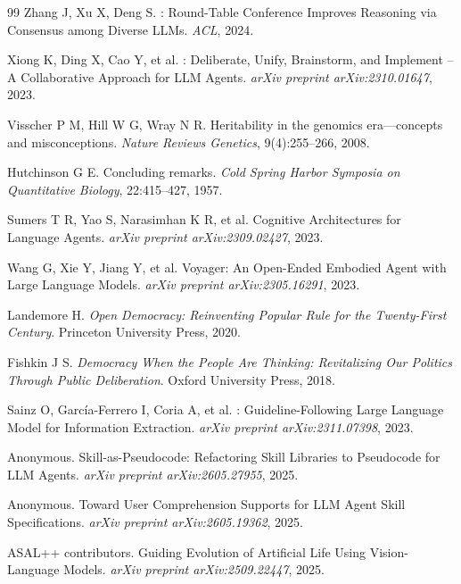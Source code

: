 \documentclass[12pt,a4paper]{ctexart}
\begin{document}
\begin{thebibliography}{99}
Zhang J, Xu X, Deng S.
: Round-Table Conference Improves Reasoning via Consensus among Diverse LLMs.
\newblock \emph{ACL}, 2024.

Xiong K, Ding X, Cao Y, et al.
: Deliberate, Unify, Brainstorm, and Implement -- A Collaborative Approach for LLM Agents.
\newblock \emph{arXiv preprint arXiv:2310.01647}, 2023.

Visscher P M, Hill W G, Wray N R.
\newblock Heritability in the genomics era---concepts and misconceptions.
\newblock \emph{Nature Reviews Genetics}, 9(4):255--266, 2008.

Hutchinson G E.
\newblock Concluding remarks.
\newblock \emph{Cold Spring Harbor Symposia on Quantitative Biology}, 22:415--427, 1957.

Sumers T R, Yao S, Narasimhan K R, et al.
\newblock Cognitive Architectures for Language Agents.
\newblock \emph{arXiv preprint arXiv:2309.02427}, 2023.

Wang G, Xie Y, Jiang Y, et al.
\newblock Voyager: An Open-Ended Embodied Agent with Large Language Models.
\newblock \emph{arXiv preprint arXiv:2305.16291}, 2023.

Landemore H.
\newblock \emph{Open Democracy: Reinventing Popular Rule for the Twenty-First Century}.
\newblock Princeton University Press, 2020.

Fishkin J S.
\newblock \emph{Democracy When the People Are Thinking: Revitalizing Our Politics Through Public Deliberation}.
\newblock Oxford University Press, 2018.

Sainz O, Garc{\'i}a-Ferrero I, Coria A, et al.
: Guideline-Following Large Language Model for Information Extraction.
\newblock \emph{arXiv preprint arXiv:2311.07398}, 2023.

Anonymous.
\newblock Skill-as-Pseudocode: Refactoring Skill Libraries to Pseudocode for {LLM} Agents.
\newblock \emph{arXiv preprint arXiv:2605.27955}, 2025.

Anonymous.
\newblock Toward User Comprehension Supports for {LLM} Agent Skill Specifications.
\newblock \emph{arXiv preprint arXiv:2605.19362}, 2025.

ASAL++ contributors.
\newblock Guiding Evolution of Artificial Life Using Vision-Language Models.
\newblock \emph{arXiv preprint arXiv:2509.22447}, 2025.


\end{thebibliography}
\end{document}
